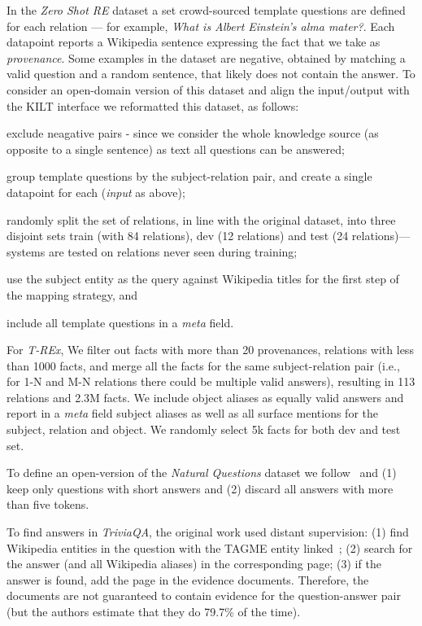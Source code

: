 \documentclass[11pt]{article}
\begin{document}
In the \textit{Zero Shot RE} dataset a set crowd-sourced template questions are defined for each relation --- for example, \emph{What is Albert Einstein’s alma mater?}.
Each datapoint reports a Wikipedia sentence expressing the fact that we take as \emph{provenance}.
Some examples in the dataset are negative, obtained by matching a valid question and a random sentence, that likely does not contain the answer. 
To consider an open-domain version of this dataset and align the input/output with the KILT interface we reformatted this dataset, as follows:
\begin{enumerate*}[label=(\roman*)] 
\item exclude neagative pairs - since we consider the whole knowledge source (as opposite to a single sentence) as text all questions can be answered;
\item group template questions by the subject-relation pair, and create a single datapoint for each (\textit{input} as above);
\item randomly split the set of relations, in line with the original dataset, into three disjoint sets train (with 84 relations), dev (12 relations) and test (24 relations)---systems are tested on relations never seen during training;
\item use the subject entity as the query against Wikipedia titles for the first step of the mapping strategy, and
\item include all template questions in a \textit{meta} field.
\end{enumerate*}

For \textit{T-REx}, We filter out facts with more than 20 provenances, relations with less than 1000 facts, and merge all the facts for the same subject-relation pair (i.e., for 1-N and M-N relations there could be multiple valid answers), resulting in 113 relations and 2.3M facts. We include object aliases as equally valid answers and report in a \textit{meta} field subject aliases as well as all surface mentions for the subject, relation and object.
We randomly select 5k facts for both dev and test set.

To define an open-version of the \textit{Natural Questions} dataset we follow~\citet{lee2019latent} and (1) keep only questions with short answers and (2) discard all answers with more than five tokens.

To find answers in \textit{TriviaQA}, the original work used distant supervision: (1) find Wikipedia entities in the question with the TAGME entity linked~\cite{ferragina2011fast}; (2) search for the answer (and all Wikipedia aliases) in the corresponding page; (3) if the answer is found, add the page in the evidence documents.
Therefore, the documents are not guaranteed to contain evidence for the question-answer pair 
(but the authors estimate that they do 79.7\% of the time).
\end{document}
